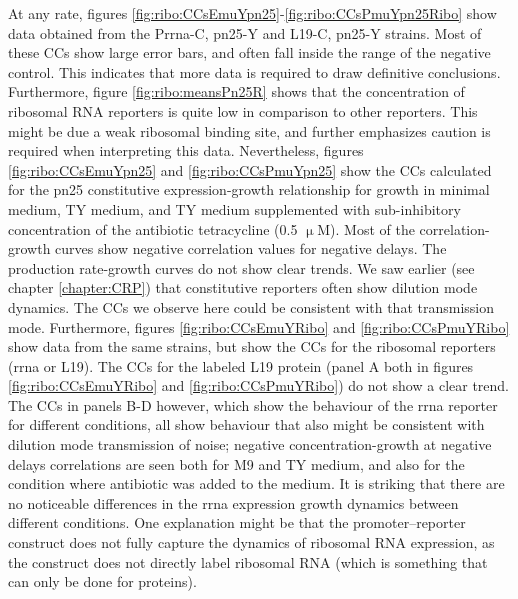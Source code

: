 At any rate, figures \ref{fig:ribo:CCsEmuYpn25}-\ref{fig:ribo:CCsPmuYpn25Ribo} show data obtained from the Prrna-C, pn25-Y and L19-C, pn25-Y strains.
%
Most of these CCs show large error bars, and often fall inside the range of the negative control.
This indicates that more data is required to draw definitive conclusions.
Furthermore, figure \ref{fig:ribo:meansPn25R} shows that the concentration of ribosomal RNA reporters is quite low in comparison to other reporters. This might be due a weak ribosomal binding site, 
and further emphasizes caution is required when interpreting this data.
%
Nevertheless, figures \ref{fig:ribo:CCsEmuYpn25} and \ref{fig:ribo:CCsPmuYpn25} show the CCs calculated for the pn25 constitutive expression-growth relationship for growth in minimal medium, TY medium, and TY medium supplemented with sub-inhibitory concentration of the antibiotic tetracycline (0.5 $\upmu$M).
%
Most of the correlation-growth curves show negative correlation values for negative delays.
The production rate-growth curves do not show clear trends.
We saw earlier (see chapter \ref{chapter:CRP}) that constitutive reporters often show dilution mode dynamics.
The CCs we observe here could be consistent with that transmission mode.
%
Furthermore, figures \ref{fig:ribo:CCsEmuYRibo} and \ref{fig:ribo:CCsPmuYRibo} show data from the same strains, but show the CCs for the ribosomal reporters (rrna or L19).
The CCs for the labeled L19 protein (panel A both in figures \ref{fig:ribo:CCsEmuYRibo} and \ref{fig:ribo:CCsPmuYRibo}) do not show a clear trend.
The CCs in panels B-D however, which show the behaviour of the rrna reporter for different conditions, all show behaviour that also might be consistent with dilution mode transmission of noise; negative concentration-growth at negative delays correlations are seen both for M9 and TY medium, and also for the condition where antibiotic was added to the medium.
%
It is striking that there are no noticeable differences in the rrna expression growth dynamics between different conditions.
%
One explanation might be that 
the promoter--reporter construct does not fully capture the dynamics of ribosomal RNA expression, as the construct does not directly label ribosomal RNA (which is something that can only be done for proteins).



